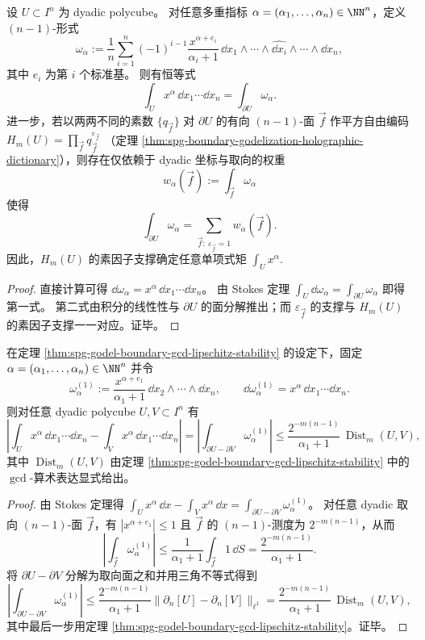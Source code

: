 \begin{theorem}\label{thm:spg-boundary-godel-moment-readout}
设 \(U\subset I^n\) 为 dyadic polycube。
对任意多重指标 \(\alpha=(\alpha_1,\dots,\alpha_n)\in\NN^n\)，定义 \((n-1)\)-形式
\[
\omega_\alpha
:=\frac1n\sum_{i=1}^n (-1)^{i-1}\frac{x^{\alpha+e_i}}{\alpha_i+1}\,
\dd x_1\wedge\cdots\wedge\widehat{\dd x_i}\wedge\cdots\wedge \dd x_n,
\]
其中 \(e_i\) 为第 \(i\) 个标准基。
则有恒等式
\[
\int_U x^\alpha\,\dd x_1\cdots \dd x_n
=\int_{\partial U}\omega_\alpha.
\]
进一步，若以两两不同的素数 \(\{q_{\vec f}\}\) 对 \(\partial U\) 的有向 \((n-1)\)-面 \(\vec f\) 作平方自由编码
\(
H_m(U)=\prod_{\vec f} q_{\vec f}^{\varepsilon_{\vec f}}
\)
（定理 \ref{thm:spg-boundary-godelization-holographic-dictionary}），则存在仅依赖于 dyadic 坐标与取向的权重
\[
w_\alpha(\vec f):=\int_{\vec f}\omega_\alpha
\]
使得
\[
\int_{\partial U}\omega_\alpha=\sum_{\vec f:\ \varepsilon_{\vec f}=1} w_\alpha(\vec f).
\]
因此，\(H_m(U)\) 的素因子支撑确定任意单项式矩 \(\int_U x^\alpha\).
\end{theorem}
\begin{proof}
直接计算可得 \( \dd\omega_\alpha=x^\alpha\,\dd x_1\cdots \dd x_n \)。
由 Stokes 定理 \(\int_U \dd\omega_\alpha=\int_{\partial U}\omega_\alpha\) 即得第一式。
第二式由积分的线性性与 \(\partial U\) 的面分解推出；而 \(\varepsilon_{\vec f}\) 的支撑与 \(H_m(U)\) 的素因子支撑一一对应。证毕。
\end{proof}

\begin{corollary}\label{cor:spg-godel-moment-robust-gcd-bound}
在定理 \ref{thm:spg-godel-boundary-gcd-lipschitz-stability} 的设定下，固定 \(\alpha=(\alpha_1,\dots,\alpha_n)\in\NN^n\) 并令
\[
\omega_{\alpha}^{(1)}:=\frac{x^{\alpha+e_1}}{\alpha_1+1}\,\dd x_2\wedge\cdots\wedge \dd x_n,
\qquad
\dd\omega_{\alpha}^{(1)}=x^\alpha\,\dd x_1\cdots\dd x_n.
\]
则对任意 dyadic polycube \(U,V\subset I^n\) 有
\[
\left|\int_U x^\alpha\,\dd x_1\cdots\dd x_n-\int_V x^\alpha\,\dd x_1\cdots\dd x_n\right|
=\left|\int_{\partial U-\partial V}\omega_{\alpha}^{(1)}\right|
\le \frac{2^{-m(n-1)}}{\alpha_1+1}\,\operatorname{Dist}_m(U,V),
\]
其中 \(\operatorname{Dist}_m(U,V)\) 由定理 \ref{thm:spg-godel-boundary-gcd-lipschitz-stability} 中的 \(\gcd\)-算术表达显式给出。
\end{corollary}
\begin{proof}
由 Stokes 定理得
\(
\int_U x^\alpha\,\dd x-\int_V x^\alpha\,\dd x=\int_{\partial U-\partial V}\omega_{\alpha}^{(1)}
\)。
对任意 dyadic 取向 \((n-1)\)-面 \(\vec f\)，有 \(|x^{\alpha+e_1}|\le 1\) 且 \(\vec f\) 的 \((n-1)\)-测度为 \(2^{-m(n-1)}\)，从而
\[
\left|\int_{\vec f}\omega_{\alpha}^{(1)}\right|
\le \frac{1}{\alpha_1+1}\int_{\vec f}1\,\dd S
=\frac{2^{-m(n-1)}}{\alpha_1+1}.
\]
将 \(\partial U-\partial V\) 分解为取向面之和并用三角不等式得到
\[
\left|\int_{\partial U-\partial V}\omega_{\alpha}^{(1)}\right|
\le \frac{2^{-m(n-1)}}{\alpha_1+1}\bigl\|\partial_n[U]-\partial_n[V]\bigr\|_{\ell^1}
=\frac{2^{-m(n-1)}}{\alpha_1+1}\,\operatorname{Dist}_m(U,V),
\]
其中最后一步用定理 \ref{thm:spg-godel-boundary-gcd-lipschitz-stability}。证毕。
\end{proof}

